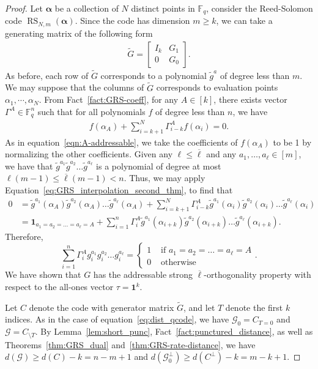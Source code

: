 \documentclass[11pt]{article}
\theoremstyle{definition}
\renewcommand{\le}{\leqslant}
\renewcommand{\ge}{\geqslant}
\newcommand{\cG}{\mathcal{G}}
\newcommand{\sm}{\setminus}
\newcommand{\al}{\alpha}
\newcommand{\bal}{\boldsymbol{\alpha}}
\newcommand{\FF}{\mathbb{F}}
\newcommand*{\ol}{\overline}
\newcommand{\punc}[2]{#1_{\sm #2}}
\newcommand{\puncT}[1]{\punc{#1}{T}}
\newcommand{\shrT}[1]{#1_{T = 0}}
\DeclareMathOperator{\RS}{RS}
\begin{document}
\begin{proof}
    Let $\bal$ be a collection of $N$ distinct points in $\FF_q$, consider the Reed-Solomon code $\RS_{N,m}(\bal)$. 
    Since the code has dimension $m\ge k$, we can take a generating matrix of the following form
    \begin{align}
        \tilde G = \begin{bmatrix}
            I_k & G_1 \\
            0 & G_0
        \end{bmatrix}.
    \end{align}
    As before, each row of $\tilde{G}$ corresponds to a polynomial $\tilde{g}^a$ of degree less than $m$.
    We may suppose that the columns of $\tilde{G}$ corresponds to evaluation points $\al_1, \cdots, \al_N$. 
    From Fact~\ref{fact:GRS-coeff}, for any $A\in [k]$, there exists vector $\Gamma^A\in \FF_q^{n}$ such that for all polynomials $f$ of degree less than $n$, we have
    \begin{align}\label{eq:GRS_interpolation_second_thm}
        f(\al_A) + \sum_{i=k+1}^N \Gamma^A_{i-k} f(\al_i) = 0.
    \end{align}
    As in equation~\eqref{eqn:A-addressable}, we take the coefficients of $f(\al_A)$ to be 1 by normalizing the other coefficients. Given any $\ell \le \ol\ell$ and any $a_1, \ldots, a_\ell \in [m]$, we have that $\tilde{g}^{a_1}\tilde{g}^{a_2}\ldots \tilde{g}^{a_\ell}$ is a polynomial of degree at most $\ell(m-1)\le\ol\ell(m-1) < n$. Thus, we may apply Equation~\eqref{eq:GRS_interpolation_second_thm}, to find that
    \begin{align}
        0 &= \tilde{g}^{a_1}(\alpha_A)\tilde{g}^{a_2}(\alpha_A)\ldots\tilde{g}^{a_\ell}(\alpha_A) + \sum_{i=k+1}^N\Gamma^A_{i-k}\tilde{g}^{a_1}(\alpha_{i})\tilde{g}^{a_2}(\alpha_i)\ldots\tilde{g}^{a_\ell}(\alpha_i)\\
        &=\mathbf{1}_{a_1 = a_2 = \ldots = a_\ell = A}+\sum_{i=1}^n\Gamma^A_i\tilde{g}^{a_1}(\alpha_{i+k})\tilde{g}^{a_2}(\alpha_{i+k})\ldots\tilde{g}^{a_\ell}(\alpha_{i+k}).
    \end{align}
    Therefore,
    \begin{equation}
        \sum_{i=1}^n\Gamma_i^Ag_i^{a_1}g_i^{a_2}\ldots g_i^{a_\ell} = \begin{cases}
            1 &\text{ if }a_1 = a_2 = \ldots = a_\ell = A\\
            0 &\text{ otherwise}
        \end{cases}.
    \end{equation}
    We have shown that $G$ has the addressable strong $\ol\ell$-orthogonality property with respect to the all-ones vector $\tau = \mathbf{1}^k$.
    
    Let $C$ denote the code with generator matrix $\tilde{G}$, and let $T$ denote the first $k$ indices. As in the case of equation~\eqref{eq:dist_qcode}, we have $\cG_0 = \shrT{C}$ and $\cG = \puncT{C}$. By Lemma~\ref{lem:short_punc}, Fact~\ref{fact:punctured_distance}, as well as Theorems~\ref{thm:GRS_dual} and~\ref{thm:GRS-rate-distance}, we have $d(\cG)\ge d(C) - k = n-m+1$ and $d(\cG_0^\perp) \ge d(C^\perp) - k = m-k+1$.
\end{proof}
\end{document}

